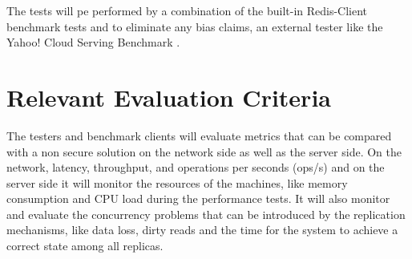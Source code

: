 The tests will pe performed by a combination of the built-in Redis-Client benchmark tests \cite{redis_benchmark:1} and to eliminate any bias claims, an external tester like the Yahoo! Cloud Serving Benchmark \cite{yahoo_benchmark:1}.

\section{Relevant Evaluation Criteria} %
\label{sec:relevant_evaluation_criteria}

The testers and benchmark clients will evaluate metrics that can be compared with a non secure solution on the network side as well as the server side. On the network, latency, throughput, and operations per seconds (ops/s) and on the server side it will monitor the resources of the machines, like memory consumption and CPU load during the performance tests. It will also monitor and evaluate the concurrency problems that can be introduced by the replication mechanisms, like data loss, dirty reads and the time for the system to achieve a correct state among all replicas.
